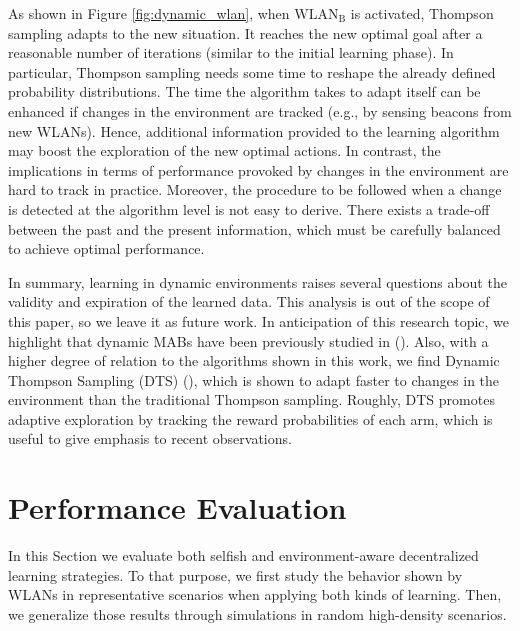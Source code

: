 \documentclass[preprint,12pt]{elsarticle}
\begin{document}
As shown in Figure \ref{fig:dynamic_wlan}, when $\text{WLAN}_\text{B}$ is activated, Thompson sampling adapts to the new situation. It reaches the new optimal goal after a reasonable number of iterations (similar to the initial learning phase). In particular, Thompson sampling needs some time to reshape the already defined probability distributions. The time the algorithm takes to adapt itself can be enhanced if changes in the environment are tracked (e.g., by sensing beacons from new WLANs). Hence, additional information provided to the learning algorithm may boost the exploration of the new optimal actions. In contrast, the implications in terms of performance provoked by changes in the environment are hard to track in practice. Moreover, the procedure to be followed when a change is detected at the algorithm level is not easy to derive. There exists a trade-off between the past and the present information, which must be carefully balanced to achieve optimal performance.

In summary, learning in dynamic environments raises several questions about the validity and expiration of the learned data. This analysis is out of the scope of this paper, so we leave it as future work. In anticipation of this research topic, we highlight that dynamic MABs have been previously studied in (\citealp{hartland2006multi}). Also, with a higher degree of relation to the algorithms shown in this work, we find Dynamic Thompson Sampling (DTS) (\citealp{gupta2011thompson}), which is shown to adapt faster to changes in the environment than the traditional Thompson sampling. Roughly, DTS promotes adaptive exploration by tracking the reward probabilities of each arm, which is useful to give emphasis to recent observations.

\section{Performance Evaluation}			
\label{section:performance_evaluation}				
In this Section we evaluate both selfish and environment-aware decentralized learning strategies. To that purpose, we first study the 
behavior shown by WLANs in representative scenarios when applying both kinds of learning. Then, we generalize those results through simulations in random high-density scenarios.

\end{document}
